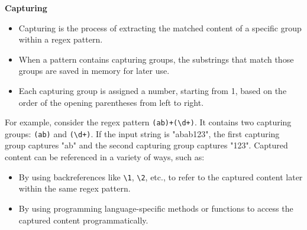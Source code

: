 \documentclass{report}
\begin{document}
    \bigbreak \noindent 
    \textbf{Capturing}
    \begin{itemize}
        \item Capturing is the process of extracting the matched content of a specific group within a regex pattern.
        \item When a pattern contains capturing groups, the substrings that match those groups are saved in memory for later use.
        \item Each capturing group is assigned a number, starting from 1, based on the order of the opening parentheses from left to right.
    \end{itemize}
    \bigbreak \noindent 
    For example, consider the regex pattern \texttt{(ab)+(\textbackslash d+)}. It contains two capturing groups: \texttt{(ab)} and \texttt{(\textbackslash d+)}. If the input string is "abab123", the first capturing group captures "ab" and the second capturing group captures "123".
    \bigbreak \noindent 
    Captured content can be referenced in a variety of ways, such as:
    \begin{itemize}
        \item By using backreferences like \texttt{\textbackslash 1}, \texttt{\textbackslash 2}, etc., to refer to the captured content later within the same regex pattern.
        \item By using programming language-specific methods or functions to access the captured content programmatically.
    \end{itemize}
    \bigbreak \noindent 


    \pagebreak
    \bigbreak
    \noindent
\end{document}
